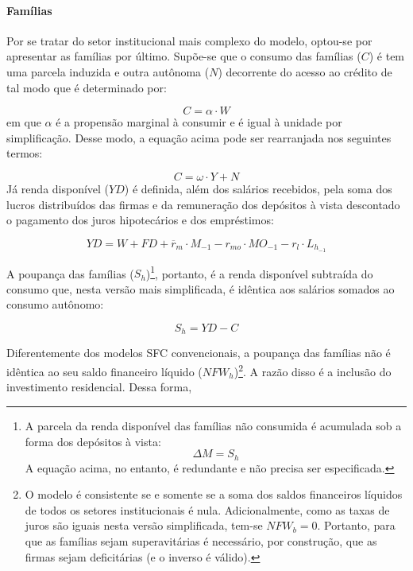 \paragraph*{Famílias} 
Por se tratar do setor institucional mais complexo do modelo, optou-se por apresentar as famílias por último. Supõe-se que o consumo das famílias ($C$) é tem uma parcela induzida e outra autônoma ($N$) decorrente do acesso ao crédito de tal modo que é determinado por:

\begin{equation}
\label{_C}
    C = \alpha\cdot W
\end{equation}
em que $\alpha$ é a propensão marginal à consumir e é igual à unidade por simplificação. Desse modo, a equação acima pode ser rearranjada nos seguintes termos:

$$
C = \omega\cdot Y + N
$$
Já renda disponível ($YD$) é definida, além dos salários recebidos, pela soma dos lucros distribuídos das firmas e da remuneração dos depósitos à vista descontado o pagamento dos juros hipotecários e dos empréstimos:

\begin{equation}
    \label{EqYD}
    YD = W + FD + \overline r_m\cdot M_{-1} - r_{mo}\cdot MO_{-1} - r_{l}\cdot L_{h_{-1}}
\end{equation}

A poupança das famílias ($S_h$)\footnote{
A parcela da renda disponível das famílias não consumida é acumulada sob a forma dos depósitos à vista:
$$
\Delta M = S_h
$$
A equação acima, no entanto, é redundante e não precisa ser especificada.}, portanto, é a renda disponível subtraída do consumo que, nesta versão mais simplificada, é idêntica aos salários somados ao consumo autônomo:

\begin{equation}
    \label{EqSh}
    S_h = YD - C
\end{equation}

Diferentemente dos modelos SFC convencionais, a poupança das famílias não é idêntica ao seu saldo financeiro líquido ($NFW_h$)\footnote{O modelo é consistente se e somente se a soma dos saldos financeiros líquidos de todos os setores institucionais é nula. Adicionalmente, como as taxas de juros são iguais nesta versão simplificada, tem-se $NFW_b = 0$. Portanto, para que as famílias sejam superavitárias é necessário, por construção, que as firmas sejam deficitárias (e o inverso é válido).
}. A razão disso é a inclusão do investimento residencial. Dessa forma, 

